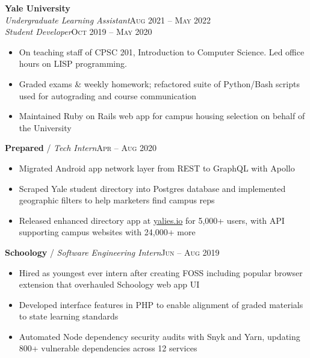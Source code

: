 \documentclass[10pt, a4paper]{article}
\begin{document}
\textbf{Yale University}\\
\textit{Undergraduate Learning Assistant}\hfill \textsc{Aug 2021 -- May 2022}\\
\textit{Student Developer}\hfill \textsc{Oct 2019 -- May 2020}\\
\begin{itemize}
    \vspace{-7mm}
    \item On teaching staff of CPSC 201, Introduction to Computer Science. Led office hours on LISP programming.
    \item Graded exams \& weekly homework; refactored suite of Python/Bash scripts used for autograding and course communication
    \item Maintained Ruby on Rails web app for campus housing selection on behalf of the University
\end{itemize}

\textbf{Prepared} / \textit{Tech Intern}\hfill \textsc{Apr -- Aug 2020}\\
\begin{itemize}
    \vspace{-7mm}
    \item Migrated Android app network layer from REST to GraphQL with Apollo
    \item Scraped Yale student directory into Postgres database and implemented geographic filters to help marketers find campus reps
    \item Released enhanced directory app at \href{https://yalies.io}{yalies.io} for 5,000+ users, with API supporting campus websites with 24,000+ more
\end{itemize}

\textbf{Schoology} / \textit{Software Engineering Intern}\hfill \textsc{Jun -- Aug 2019}\\
\begin{itemize}
    \vspace{-7mm}
    \item Hired as youngest ever intern after creating FOSS including popular browser extension that overhauled Schoology web app UI
    \item Developed interface features in PHP to enable alignment of graded materials to state learning standards
    \item Automated Node dependency security audits with Snyk and Yarn, updating 800+ vulnerable dependencies across 12 services
\end{itemize}
\end{document}

